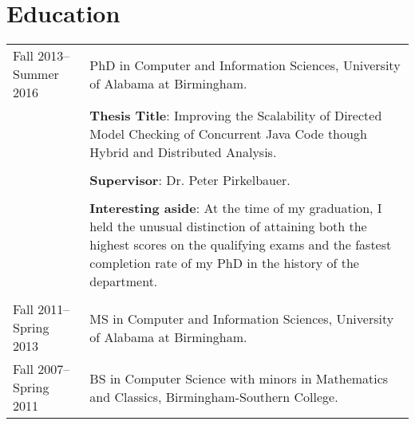 \documentclass[a4paper,12pt]{article}
\begin{document}
\section{Education}
\begin{tabularx}{\linewidth}{@{}l X@{}}	
Fall 2013--Summer 2016&PhD in Computer and Information Sciences, University of Alabama at Birmingham.\\[5pt]
&\textbf{Thesis Title}: Improving the Scalability of Directed Model Checking of Concurrent Java Code though Hybrid and Distributed Analysis.\\\\
&\textbf{Supervisor}: Dr. Peter Pirkelbauer.\\\\
&\textbf{Interesting aside}: At the time of my graduation, I held the unusual distinction of attaining both the highest scores on the qualifying exams and the fastest completion rate of my PhD in the history of the department. \\\\
Fall 2011--Spring 2013&MS in Computer and Information Sciences, University of Alabama at Birmingham.\\
Fall 2007--Spring 2011&BS in Computer Science with minors in Mathematics and Classics, Birmingham-Southern College.\\
\end{tabularx}



\end{document}
